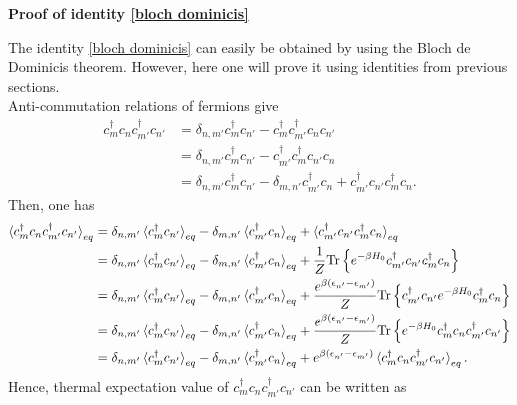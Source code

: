 \documentclass[a4paper,12pts,dvipsnames]{article}
\numberwithin{equation}{section}
\begin{document}
\begin{mdframed}[backgroundcolor=gray!16]
	\textbf{Proof of identity \ref*{bloch dominicis}}\begin{center}
		\begin{minipage}{42em}
			The identity \ref{bloch dominicis} can easily be obtained by using the Bloch de Dominicis theorem. However, here one will prove it using identities from previous sections.\\
			Anti-commutation relations of fermions give
			\begin{align}
				c^{\dagger}_mc_nc^{\dagger}_{m'}c_{n'} &= \delta_{n,m'}c^{\dagger}_mc_{n'} - c^{\dagger}_mc^{\dagger}_{m'}c_nc_{n'}\\ &= \delta_{n,m'}c^{\dagger}_mc_{n'} - c^{\dagger}_{m'}c^{\dagger}_mc_{n'}c_n\\ &= \delta_{n,m'}c^{\dagger}_mc_{n'} - \delta_{m,n'}c^{\dagger}_{m'}c_n + c^{\dagger}_{m'}c_{n'}c^{\dagger}_mc_n .
			\end{align}
			Then, one has
			\begin{align}
			\braket{c^{\dagger}_mc_nc^{\dagger}_{m'}c_{n'}}_{eq} &= \delta_{n,m'}\braket{c^{\dagger}_mc_{n'}}_{eq} - \delta_{m,n'}\braket{c^{\dagger}_{m'}c_n}_{eq} + \braket{c^{\dagger}_{m'}c_{n'}c^{\dagger}_mc_n}_{eq}\\
			&= \delta_{n,m'}\braket{c^{\dagger}_mc_{n'}}_{eq} - \delta_{m,n'}\braket{c^{\dagger}_{m'}c_n}_{eq} + \frac{1}{Z}\text{Tr}\left\lbrace e^{-\beta H_0}c^{\dagger}_{m'}c_{n'}c^{\dagger}_mc_n\right\rbrace\\
			&= \delta_{n,m'}\braket{c^{\dagger}_mc_{n'}}_{eq} - \delta_{m,n'}\braket{c^{\dagger}_{m'}c_n}_{eq} + \frac{e^{\beta\left(\epsilon_{n'}-\epsilon_{m'}\right)}}{Z}\text{Tr}\left\lbrace c^{\dagger}_{m'}c_{n'}e^{-\beta H_0}c^{\dagger}_mc_n\right\rbrace\\
			&= \delta_{n,m'}\braket{c^{\dagger}_mc_{n'}}_{eq} - \delta_{m,n'}\braket{c^{\dagger}_{m'}c_n}_{eq} + \frac{e^{\beta\left(\epsilon_{n'}-\epsilon_{m'}\right)}}{Z}\text{Tr}\left\lbrace e^{-\beta H_0}c^{\dagger}_mc_nc^{\dagger}_{m'}c_{n'}\right\rbrace\\
			&= \delta_{n,m'}\braket{c^{\dagger}_mc_{n'}}_{eq} - \delta_{m,n'}\braket{c^{\dagger}_{m'}c_n}_{eq} + e^{\beta\left(\epsilon_{n'}-\epsilon_{m'}\right)}\braket{c^{\dagger}_mc_nc^{\dagger}_{m'}c_{n'}}_{eq}.
			\end{align}
			Hence, thermal expectation value of $c^{\dagger}_mc_nc^{\dagger}_{m'}c_{n'}$ can be written as
		\end{minipage}
		\begin{minipage}{42em}

\end{minipage}
\end{center}
\end{mdframed}
\end{document}
